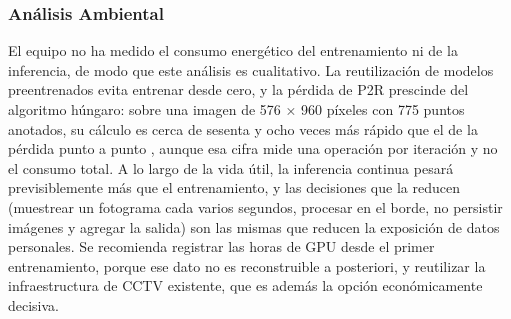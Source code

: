 \subsubsection{Análisis Ambiental}
\label{sec:impacto-ambiental}

El equipo no ha medido el consumo energético del entrenamiento ni de la
inferencia, de modo que este análisis es cualitativo. La reutilización
de modelos preentrenados evita entrenar desde cero, y la pérdida de P2R
prescinde del algoritmo húngaro: sobre una imagen de 576 × 960 píxeles
con 775 puntos anotados, su cálculo es cerca de sesenta y ocho veces más
rápido que el de la pérdida punto a punto \cite{Lin_2025_CVPR}, aunque
esa cifra mide una operación por iteración y no el consumo total. A lo
largo de la vida útil, la inferencia continua pesará previsiblemente más
que el entrenamiento, y las decisiones que la reducen (muestrear un
fotograma cada varios segundos, procesar en el borde, no persistir
imágenes y agregar la salida) son las mismas que reducen la exposición
de datos personales. Se recomienda registrar las horas de GPU desde el
primer entrenamiento, porque ese dato no es reconstruible a posteriori,
y reutilizar la infraestructura de CCTV existente, que es además la
opción económicamente decisiva.
